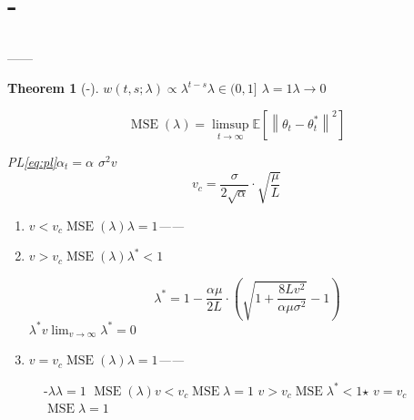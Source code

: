 \documentclass[11pt,a4paper]{article}
\newtheorem{theorem}{Theorem}[section]
\theoremstyle{remark}
\DeclareMathOperator{\MSE}{MSE}
\newcommand{\E}{\mathbb{E}}
\newcommand{\norm}[1]{\left\lVert#1\right\rVert}
\begin{document}
\section{-}

\subsection{}

\textbf{}——\textbf{}

\textbf{}

\begin{theorem}[-]\label{thm:phase_transition}
$w(t, s; \lambda) \propto \lambda^{t-s}$$\lambda \in (0, 1]$
\textbf{}$\lambda = 1$$\lambda \to 0$

\begin{equation}
    \MSE(\lambda) = \limsup_{t \to \infty} \E[\norm{\theta_t - \theta_t^*}^2]
\end{equation}

PL\eqref{eq:pl}$\alpha_t = \alpha$
$\sigma^2$$v$\textbf{}
\begin{equation}
    \boxed{
    v_c = \frac{\sigma}{2\sqrt{\alpha}} \cdot \sqrt{\frac{\mu}{L}}
    }
\end{equation}

\begin{enumerate}[label=(\arabic*)]
    \item \textbf{$v < v_c$}$\MSE(\lambda)$$\lambda = 1$——
          
    \item \textbf{$v > v_c$}$\MSE(\lambda)$$\lambda^* < 1$
          
          \begin{equation}
              \lambda^* = 1 - \frac{\alpha \mu}{2L} \cdot \left(\sqrt{1 + \frac{8Lv^2}{\alpha\mu\sigma^2}} - 1\right)
          \end{equation}
          $\lambda^*$$v$$\lim_{v \to \infty} \lambda^* = 0$
    \item \textbf{$v = v_c$}$\MSE(\lambda)$$\lambda = 1$——
          
\end{enumerate}
\end{theorem}

\begin{figure}[htbp]
\centering
\caption{-$\lambda$$\lambda=1$
$\MSE(\lambda)$$v < v_c$$\MSE$$\lambda=1$
$v > v_c$$\MSE$$\lambda^* < 1$$\star$
$v = v_c$$\MSE$$\lambda=1$}
\label{fig:phase_diagram}
\end{figure}
\end{document}

